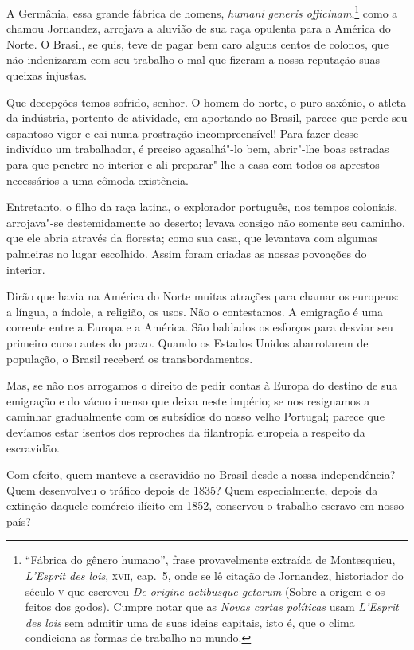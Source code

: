 A Germânia, essa grande fábrica de homens, \textit{humani generis
officinam},\footnote{ ``Fábrica do gênero humano'', frase provavelmente extraída de Montesquieu, 
\textit{L'Esprit des lois}, \textsc{xvii}, cap.~5, onde se lê citação de Jornandez, historiador do século \textsc{v} 
que escreveu \textit{De origine actibusque getarum} (Sobre a origem e os feitos dos godos). Cumpre notar que 
as \textit{Novas cartas políticas} usam \textit{L'Esprit des lois} sem admitir uma de suas ideias capitais, isto é, que o clima 
condiciona as formas de trabalho no mundo.} como a chamou Jornandez, arrojava a aluvião de sua 
raça opulenta para a América do Norte. O Brasil, se quis, teve de pagar bem caro alguns centos de colonos, que
não indenizaram com seu trabalho o mal que fizeram a nossa reputação suas queixas injustas.

 Que decepções temos sofrido, senhor. O homem do norte, o puro saxônio,
o atleta da indústria, portento de atividade, em aportando ao Brasil,
parece que perde seu espantoso vigor e cai numa prostração
incompreensível! Para fazer desse indivíduo um trabalhador, é preciso
agasalhá"-lo bem, abrir"-lhe boas estradas para que penetre no
interior e ali preparar"-lhe a casa com todos os aprestos necessários
a uma cômoda existência. 

 Entretanto, o filho da raça latina, o explorador português, nos tempos
coloniais, arrojava"-se destemidamente ao deserto; levava consigo não
somente seu caminho, que ele abria através da floresta; como sua casa,
que levantava com algumas palmeiras no lugar escolhido. Assim foram
criadas as nossas povoações do interior. 

 Dirão que havia na América do Norte muitas atrações para chamar os
europeus: a língua, a índole, a religião, os usos. Não o contestamos. A
emigração é uma corrente entre a Europa e a América. São baldados os
esforços para desviar seu primeiro curso antes do prazo. Quando os
Estados Unidos abarrotarem de população, o Brasil receberá os
transbordamentos. 

 Mas, se não nos arrogamos o direito de pedir contas à Europa do destino
de sua emigração e do vácuo imenso que deixa neste império; se nos
resignamos a caminhar gradualmente com os subsídios do nosso velho
Portugal; parece que devíamos estar isentos dos reproches da
filantropia europeia a respeito da escravidão.

 Com efeito, quem manteve a escravidão no Brasil desde a nossa
independência? Quem desenvolveu o tráfico depois de 1835? Quem
especialmente, depois da extinção daquele comércio ilícito em 1852,
conservou o trabalho escravo em nosso país?


